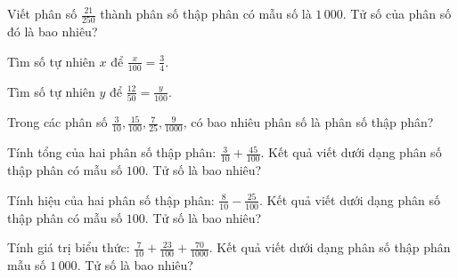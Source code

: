 \begin{ex}
  Viết phân số $\frac{21}{250}$ thành phân số thập phân có mẫu số là $1\,000$. Tử số của phân số đó là bao nhiêu?
\end{ex}

\begin{ex}
  Tìm số tự nhiên $x$ để $\frac{x}{100} = \frac{3}{4}$.
\end{ex}

\begin{ex}
  Tìm số tự nhiên $y$ để $\frac{12}{50} = \frac{y}{100}$.
\end{ex}

\begin{ex}
  Trong các phân số $\frac{3}{10}, \frac{15}{100}, \frac{7}{25}, \frac{9}{1000}$, có bao nhiêu phân số là phân số thập phân?
\end{ex}

\begin{ex}
  Tính tổng của hai phân số thập phân: $\frac{3}{10} + \frac{45}{100}$. Kết quả viết dưới dạng phân số thập phân có mẫu số $100$. Tử số là bao nhiêu?
\end{ex}

\begin{ex}
  Tính hiệu của hai phân số thập phân: $\frac{8}{10} - \frac{25}{100}$. Kết quả viết dưới dạng phân số thập phân có mẫu số $100$. Tử số là bao nhiêu?
\end{ex}

\begin{ex}
  Tính giá trị biểu thức: $\frac{7}{10} + \frac{23}{100} + \frac{70}{1000}$. Kết quả viết dưới dạng phân số thập phân mẫu số $1\,000$. Tử số là bao nhiêu?
\end{ex}

